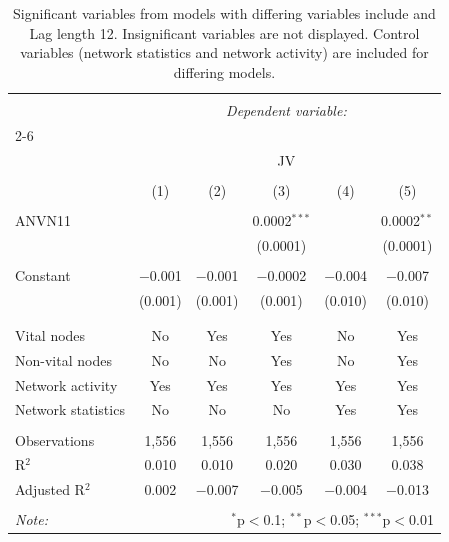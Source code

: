 
\begin{table}[!htbp] \centering 
  \caption{Significant variables from models with differing variables include 
                               and Lag length 12. Insignificant variables are not displayed. 
                               Control variables (network statistics and network activity) are 
                               included for differing models.} 
  \label{Jmodels1_5min_t} 
\scriptsize 
\begin{tabular}{@{\extracolsep{5pt}}lccccc} 
\\[-1.8ex]\hline 
\hline \\[-1.8ex] 
 & \multicolumn{5}{c}{\textit{Dependent variable:}} \\ 
\cline{2-6} 
\\[-1.8ex] & \multicolumn{5}{c}{JV} \\ 
\\[-1.8ex] & (1) & (2) & (3) & (4) & (5)\\ 
\hline \\[-1.8ex] 
 ANVN11 &  &  & 0.0002$^{***}$ &  & 0.0002$^{**}$ \\ 
  &  &  & (0.0001) &  & (0.0001) \\ 
  & & & & & \\ 
 Constant & $-$0.001 & $-$0.001 & $-$0.0002 & $-$0.004 & $-$0.007 \\ 
  & (0.001) & (0.001) & (0.001) & (0.010) & (0.010) \\ 
  & & & & & \\ 
\hline \\[-1.8ex] 
Vital nodes & No & Yes & Yes & No & Yes \\ 
Non-vital nodes & No & No & Yes & No & Yes \\ 
Network activity & Yes & Yes & Yes & Yes & Yes \\ 
Network statistics & No & No & No & Yes & Yes \\ 
\hline &  &  &  &  &  \\ 
Observations & 1,556 & 1,556 & 1,556 & 1,556 & 1,556 \\ 
R$^{2}$ & 0.010 & 0.010 & 0.020 & 0.030 & 0.038 \\ 
Adjusted R$^{2}$ & 0.002 & $-$0.007 & $-$0.005 & $-$0.004 & $-$0.013 \\ 
\hline 
\hline \\[-1.8ex] 
\textit{Note:}  & \multicolumn{5}{r}{$^{*}$p$<$0.1; $^{**}$p$<$0.05; $^{***}$p$<$0.01} \\ 
\end{tabular} 
\end{table} 
